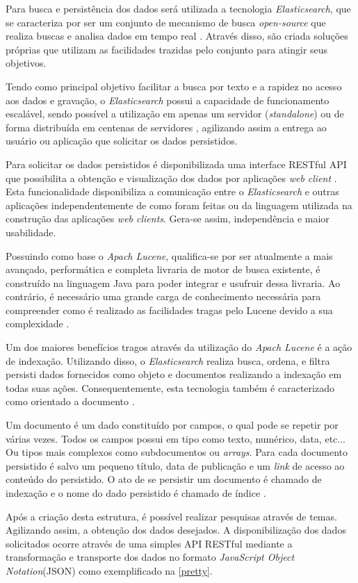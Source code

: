 Para busca e persistência dos dados será utilizada a tecnologia \textit{Elasticsearch}, que se caracteriza por ser um conjunto de mecanismo de busca \textit{open-source} que realiza buscas e analisa dados em tempo real \cite{Gil:2010}. Através disso, são criada soluções próprias que utilizam as  facilidades trazidas pelo conjunto para atingir seus objetivos.

Tendo como principal objetivo facilitar a busca por texto e a rapidez no acesso aos dados e gravação, o \textit{Elasticsearch} possui a capacidade de funcionamento escalável, sendo possível a utilização em apenas um servidor (\textit{standalone}) ou de forma distribuída em centenas de servidores \cite{Gormley:2015}, agilizando assim a entrega ao usuário ou aplicação que solicitar os dados persistidos.

Para solicitar os dados persistidos é disponibilizada uma interface RESTful API que possibilita a obtenção e visualização dos dados por aplicações \textit{web client} \cite{Gormley:2015}. Esta funcionalidade disponibiliza a comunicação entre o \textit{Elasticsearch} e outras aplicações independentemente de como foram feitas ou da linguagem utilizada na construção das aplicações \textit{web clients}. Gera-se assim, independência e maior usabilidade.

Possuindo como base o \textit{Apach Lucene}, qualifica-se por ser atualmente a mais avançado, performática e completa livraria de motor de busca existente, é construído na linguagem Java para poder integrar e usufruir dessa livraria. Ao contrário, é necessário uma grande carga de conhecimento necessária para compreender como é realizado as facilidades tragas pelo Lucene devido a sua complexidade \cite{Gormley:2015}.

Um dos maiores benefícios tragos através da utilização do \textit{Apach Lucene} é a ação de indexação. Utilizando disso, o \textit{Elasticsearch} realiza busca, ordena, e filtra persisti dados fornecidos como objeto e documentos realizando a indexação em todas suas ações. Consequentemente, esta tecnologia também é caracterizado como orientado a documento \cite{Gormley:2015}.

Um documento é um dado constituído por campos, o qual pode se repetir por várias vezes. Todos os campos possui em tipo como texto, numérico, data, etc... Ou tipos mais complexos como subdocumentos ou \textit{arrays}. Para cada documento persistido é salvo um pequeno título, data de publicação e um \textit{link} de acesso ao conteúdo do persistido. O ato de se persistir um documento é chamado de indexação e o nome do dado persistido é chamado de índice \cite{Kuc:2013}.

Após a criação desta estrutura, é possível realizar pesquisas através de temas. Agilizando assim, a obtenção dos dados desejados. A disponibilização dos dados solicitados ocorre através de uma simples API RESTful mediante a transformação e transporte dos dados no formato \textit{JavaScript Object Notation}(JSON) como exemplificado na \autoref{pretty}.
